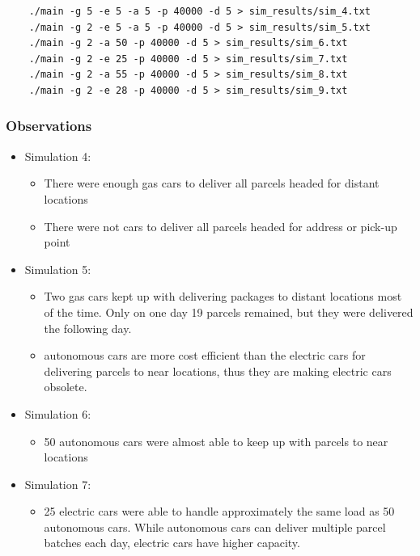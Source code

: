 \documentclass[a4paper, 11pt, a4paper]{article}
\begin{document}
\begin{verbatim}
    ./main -g 5 -e 5 -a 5 -p 40000 -d 5 > sim_results/sim_4.txt
    ./main -g 2 -e 5 -a 5 -p 40000 -d 5 > sim_results/sim_5.txt
    ./main -g 2 -a 50 -p 40000 -d 5 > sim_results/sim_6.txt
    ./main -g 2 -e 25 -p 40000 -d 5 > sim_results/sim_7.txt
    ./main -g 2 -a 55 -p 40000 -d 5 > sim_results/sim_8.txt
    ./main -g 2 -e 28 -p 40000 -d 5 > sim_results/sim_9.txt

\end{verbatim}

\subsubsection*{Observations}

\begin{itemize}
    \item Simulation 4:
    \begin{itemize}
        \item There were enough gas cars to deliver all parcels headed for
        distant locations
        \item There were not cars to deliver all parcels headed for address or
        pick-up point
    \end{itemize}
    \item Simulation 5:
    \begin{itemize}
        \item Two gas cars kept up with delivering packages to distant locations
        most of the time. Only on one day 19 parcels remained, but they were
        delivered the following day.
        \item autonomous cars are more cost efficient than the electric cars for
        delivering parcels to near locations, thus they are making electric cars obsolete.
    \end{itemize}
    \item Simulation 6:
    \begin{itemize}
        \item 50 autonomous cars were almost able to keep up with parcels to
        near locations
    \end{itemize}
    \item Simulation 7:
    \begin{itemize}
        \item 25 electric cars were able to handle approximately the same load
        as 50 autonomous cars. While autonomous cars can deliver multiple
        parcel batches each day, electric cars have higher capacity.

\end{itemize}
\end{itemize}
\end{document}

